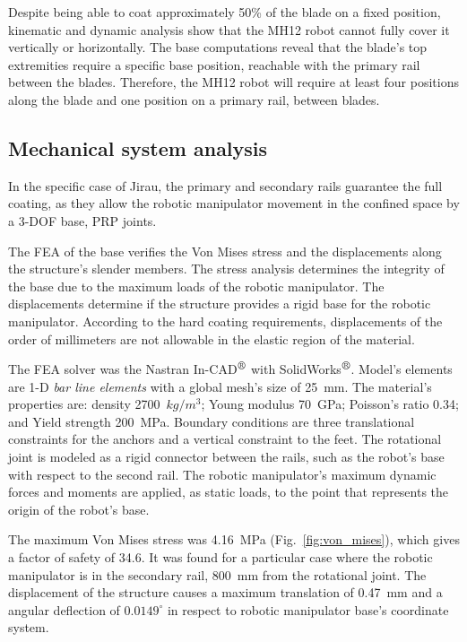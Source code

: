 Despite being able to coat approximately 50\% of the blade on a fixed position,
kinematic and dynamic analysis show that the MH12 robot cannot fully cover it
vertically or horizontally. The base computations reveal that the
blade's top extremities require a specific base position, reachable with the
primary rail between the blades. Therefore, the MH12 robot will require at least
four positions along the blade and one position on a primary rail, between
blades.

\subsection{Mechanical system analysis}

In the specific case of Jirau, %
the primary and secondary rails %
guarantee the full coating, as
they allow the robotic manipulator movement in the confined space by a 3-DOF
base, PRP joints.

The FEA of the base verifies the Von Mises stress and the displacements
along the structure's slender members. The stress analysis determines the
integrity of the base due to the maximum loads of the robotic manipulator. The
displacements determine if the structure provides a rigid base for the robotic
manipulator. According to the hard coating requirements, displacements of the
order of millimeters are not allowable in the elastic region of the
material. 

The FEA solver was the Nastran In-CAD$^{\mbox{\small\textregistered}}$ with
SolidWorks$^{\mbox{\small\textregistered}}$. Model's elements are 1-D 
\textit{bar line elements} with a global mesh's size of 25~mm. The material's
properties are: density 2700~$kg/m^3$; Young modulus 70~GPa; Poisson's ratio
0.34; and Yield strength 200~MPa. Boundary conditions are three translational
constraints for the anchors and a vertical constraint to the feet. The
rotational joint is modeled as a rigid connector between the rails, such as the
robot's base with respect to the second rail. The robotic manipulator's maximum
dynamic forces and moments are applied, as static loads, to the point that
represents the origin of the robot's base.

The maximum Von Mises stress was 4.16~MPa (Fig.~\ref{fig:von_mises}), which
gives a factor of safety of 34.6. It was found for a particular case where the
robotic manipulator is in the secondary rail, 800~mm from the rotational joint.
The displacement of the structure causes a maximum translation of 0.47~mm and a
angular deflection of $0.0149^{\circ}$ in respect to robotic manipulator base's
coordinate system.

